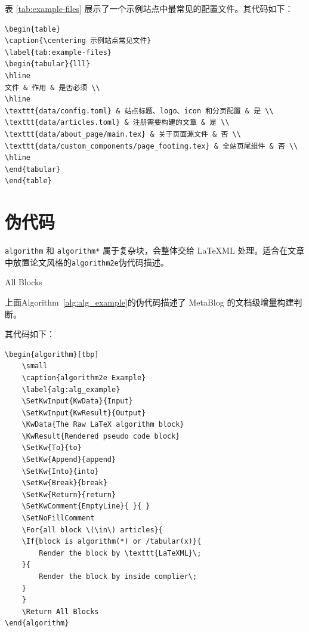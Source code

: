 表 \ref{tab:example-files} 展示了一个示例站点中最常见的配置文件。其代码如下：
\begin{verbatim}
\begin{table}
\caption{\centering 示例站点常见文件}
\label{tab:example-files}
\begin{tabular}{lll}
\hline
文件 & 作用 & 是否必须 \\
\hline
\texttt{data/config.toml} & 站点标题、logo、icon 和分页配置 & 是 \\
\texttt{data/articles.toml} & 注册需要构建的文章 & 是 \\
\texttt{data/about_page/main.tex} & 关于页面源文件 & 否 \\
\texttt{data/custom_components/page_footing.tex} & 全站页尾组件 & 否 \\
\hline
\end{tabular}
\end{table}
\end{verbatim}


\section{伪代码}

\texttt{algorithm} 和 \texttt{algorithm*} 属于复杂块，会整体交给 LaTeXML 处理。适合在文章中放置论文风格的\texttt{algorithm2e}伪代码描述。

\begin{algorithm}[tbp]
    \small
    \caption{algorithm2e Example}
    \label{alg:alg_example}
    \SetNoFillComment
    \Return All Blocks
\end{algorithm}

上面Algorithm~\ref{alg:alg_example}的伪代码描述了 MetaBlog 的文档级增量构建判断。

其代码如下：
\begin{verbatim}
\begin{algorithm}[tbp]
    \small
    \caption{algorithm2e Example}
    \label{alg:alg_example}
    \SetKwInput{KwData}{Input}
    \SetKwInput{KwResult}{Output}
    \KwData{The Raw LaTeX algorithm block}
    \KwResult{Rendered pseudo code block}
    \SetKw{To}{to}
    \SetKw{Append}{append}
    \SetKw{Into}{into}
    \SetKw{Break}{break}
    \SetKw{Return}{return}
    \SetKwComment{EmptyLine}{ }{ }
    \SetNoFillComment
    \For{all block \(\in\) articles}{
    \If{block is algorithm(*) or /tabular(x)}{
        Render the block by \texttt{LaTeXML}\;
    }{
        Render the block by inside complier\;
    }
    }
    \Return All Blocks
\end{algorithm}
\end{verbatim}

